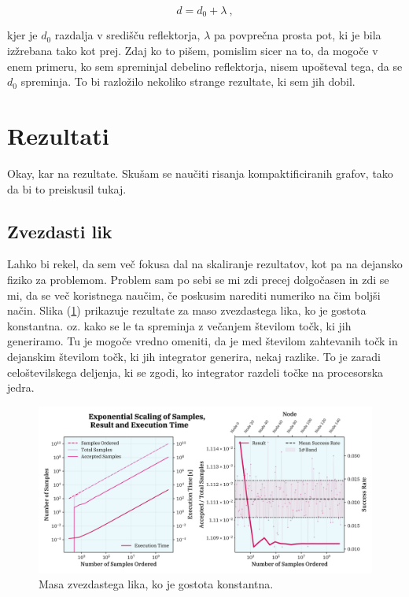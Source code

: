 \documentclass[a4paper]{article}
\begin{document}
\begin{equation}
    d = d_0 + \lambda\>,
\end{equation}

kjer je $d_0$ razdalja v središču reflektorja, $\lambda$ pa povprečna prosta pot, ki je bila izžrebana tako kot prej. Zdaj ko to pišem,
pomislim sicer na to, da mogoče v enem primeru, ko sem spreminjal debelino reflektorja, nisem upošteval tega, da se $d_0$ spreminja. To 
bi razložilo nekoliko strange rezultate, ki sem jih dobil. \\

\section{Rezultati}
Okay, kar na rezultate. Skušam se naučiti risanja kompaktificiranih grafov, tako da bi to preiskusil tukaj. \\

\subsection{Zvezdasti lik}
Lahko bi rekel, da sem več fokusa dal na skaliranje rezultatov, kot pa na dejansko fiziko za problemom. Problem sam po 
sebi se mi zdi precej dolgočasen in zdi se mi, da se več koristnega naučim, če poskusim narediti numeriko na 
čim boljši način. Slika (\ref{fig:mass_const}) prikazuje rezultate za maso zvezdastega lika, ko je gostota konstantna.
oz. kako se le ta spreminja z večanjem številom točk, ki jih generiramo. Tu je mogoče vredno omeniti, da je med 
številom zahtevanih točk in dejanskim številom točk, ki jih integrator generira, nekaj razlike. To je zaradi 
celoštevilskega deljenja, ki se zgodi, ko integrator razdeli točke na procesorska jedra. 

\begin{figure}[H]
    \centering
    \includegraphics[width=\textwidth]{../StarShapes/Images/mass_const.png}
    \caption{Masa zvezdastega lika, ko je gostota konstantna.}
    \label{fig:mass_const}
\end{figure}
\end{document}
